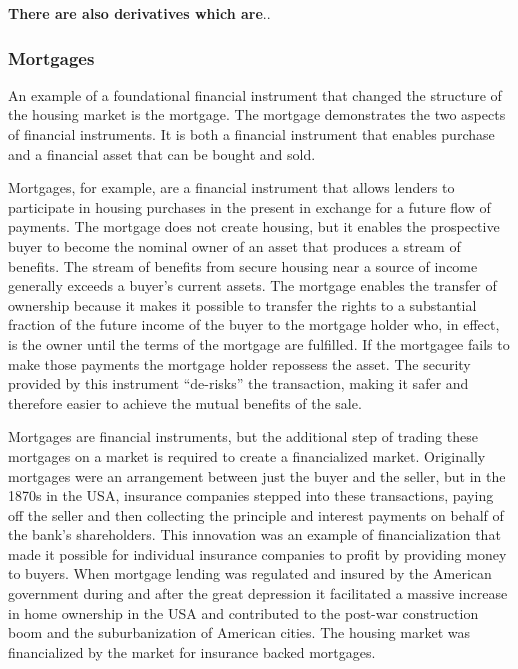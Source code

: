 \textbf{There are also derivatives which are}..

\subsubsection{Mortgages}
An example of a foundational financial instrument that changed the structure of the housing market is the mortgage. The mortgage demonstrates the two aspects of financial instruments. It is both a financial instrument that enables  purchase and a financial asset that can be bought and sold. 

Mortgages, for example, are a financial instrument that allows lenders to  participate in housing purchases in the present in exchange for a future flow of payments.  The mortgage does not create housing, but it enables the prospective buyer to become the nominal owner of an asset that produces a stream of benefits. The stream of benefits from secure housing near a source of income generally exceeds a buyer's current assets. The mortgage enables the transfer of ownership because it makes it possible to transfer the rights to a substantial fraction of the future income of the buyer to the mortgage holder who, in effect, is the owner until the terms of the mortgage are fulfilled.  If the mortgagee fails to make those payments the mortgage holder repossess the asset. The security provided by this instrument ``de-risks'' the transaction, making it safer and therefore easier to achieve the mutual benefits of the sale.

Mortgages are  financial instruments, but %
the additional step of trading these mortgages on a market is required to create a financialized market. 
Originally mortgages were an arrangement between just the buyer and the seller, but in the 1870s in the USA, insurance companies stepped into these transactions, paying off the seller and then collecting the principle and interest payments on behalf of the bank's shareholders. This innovation was an example of financialization that made it possible for individual insurance companies to profit by providing money to buyers. When mortgage lending was regulated and insured  by the American government during and after the great depression it facilitated a massive increase in home ownership in the USA and contributed to the post-war construction boom and the suburbanization of American cities. The housing market was financialized by the market for insurance backed mortgages.

